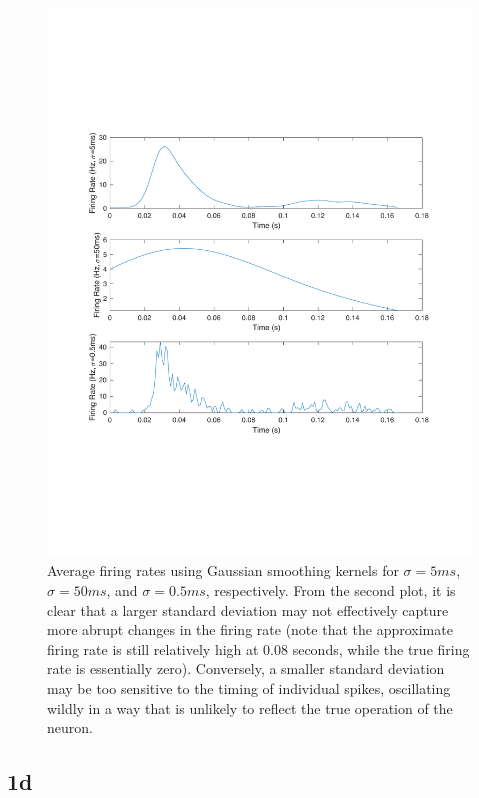 \documentclass[]{article}
\begin{document}
\begin{figure}[H]
    \centering
    \includegraphics[width=0.8\linewidth]{problem1bc.pdf}
    \caption{Average firing rates using Gaussian smoothing kernels for $\sigma=5ms$, $\sigma=50ms$, and $\sigma=0.5ms$, respectively. From the second plot, it is clear that a larger standard deviation may not effectively capture more abrupt changes in the firing rate (note that the approximate firing rate is still relatively high at 0.08 seconds, while the true firing rate is essentially zero). Conversely, a smaller standard deviation may be too sensitive to the timing of individual spikes, oscillating wildly in a way that is unlikely to reflect the true operation of the neuron.}
    \label{fig:my_label}
\end{figure}

\subsection*{1d}
\end{document}
